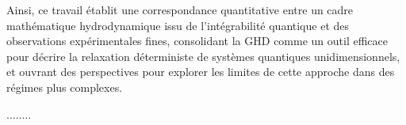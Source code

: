Ainsi, ce travail établit une correspondance quantitative entre un cadre mathématique hydrodynamique issu de l’intégrabilité quantique et des observations expérimentales fines, consolidant la GHD comme un outil efficace pour décrire la relaxation déterministe de systèmes quantiques unidimensionnels, et ouvrant des perspectives pour explorer les limites de cette approche dans des régimes plus complexes.
 




........

